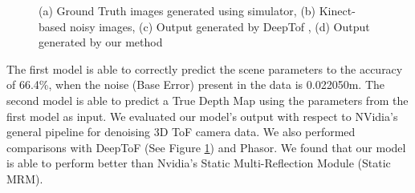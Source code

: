 \documentclass[runningheads]{llncs}
\begin{document}
\begin{figure}
    
    \caption{(a) Ground Truth images generated using simulator, (b) Kinect-based noisy images, (c) Output generated by DeepTof \cite{marco2017deeptof}, (d) Output generated by our method}
    \label{fig:deeptof_compare}
\end{figure}

The first model is able to correctly predict the scene parameters to the accuracy of 66.4\%, when the noise (Base Error) present in the data is 0.022050m. The second model is able to predict a True Depth Map using the parameters from the first model as input.
\newline
\newline
 We evaluated our model's output with respect to NVidia's general pipeline for denoising 3D ToF camera data. We also performed comparisons with DeepToF (See Figure \ref{fig:deeptof_compare}) and Phasor. We found that our model is able to perform better than Nvidia's Static Multi-Reflection Module (Static MRM).
    
\end{document}
